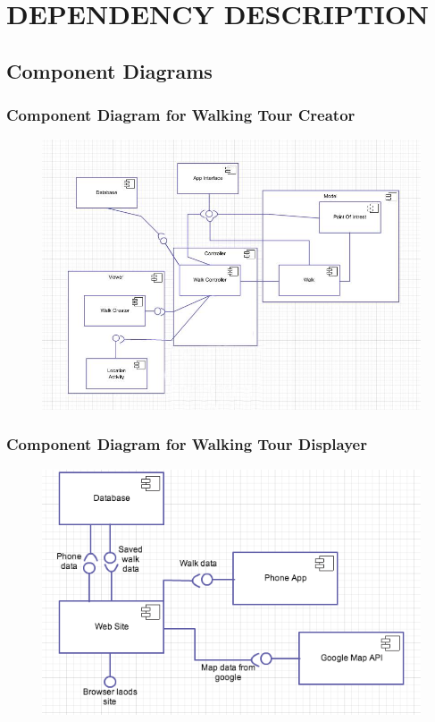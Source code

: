 \documentclass{project}
\begin{document}
\newpage


\section{DEPENDENCY DESCRIPTION}
\subsection{Component Diagrams}

\subsubsection{Component Diagram for Walking Tour Creator}
\begin{figure}[h] 

\includegraphics[width=15cm]{NewComponentDiagram.jpg}
\end{figure}

\newpage

\subsubsection{Component Diagram for Walking Tour Displayer}
\begin{figure}[h] 
    \includegraphics[width=15cm]{compontent_diagram_WTD.png}
\end{figure}
\end{document}
